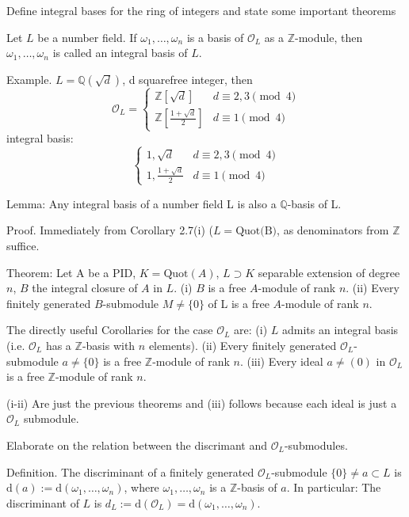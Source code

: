 Define integral bases for the ring of integers and state some
important theorems


Let \(L\) be a number field. If 
\(\omega_1, \ldots, \omega_n\) is a basis of \(\mathcal{O}_L\) as a \(\mathbb{Z}\)-module, then \(\omega_1, \ldots, \omega_n\) 
is called an integral basis of \(L\).

Example. 
\(L = \mathbb{Q}(\sqrt{d})\), d squarefree integer, then
\[
\mathcal{O}_L = 
\begin{cases} 
\mathbb{Z}[\sqrt{d}] & d \equiv 2, 3 \pmod{4} \\
\mathbb{Z}\left[\frac{1+\sqrt{d}}{2}\right] & d \equiv 1 \pmod{4} 
\end{cases}
\]
integral basis:
\[
\begin{cases} 
1, \sqrt{d} & d \equiv 2, 3 \pmod{4} \\
1, \frac{1+\sqrt{d}}{2} & d \equiv 1 \pmod{4} 
\end{cases}
\]

Lemma: Any integral basis of a number field L is also a \(\mathbb{Q}\)-basis of L.

Proof. Immediately from Corollary 2.7(i) (\( L = \text{Quot(B)} \), as denominators from \(\mathbb{Z}\) suffice.

Theorem:
Let A be a PID, \(K = \text{Quot}(A)\), \(L \supset K\) separable extension of degree \(n\), 
\(B\) the integral closure of \(A\) in \(L\).
(i) \(B\) is a free \(A\)-module of rank \(n\).
(ii) Every finitely generated \(B\)-submodule \(M \neq \{0\}\) of L is a free \(A\)-module of rank \( n \).

The directly useful Corollaries for the case \( \mathcal{O}_L \) are: 
(i) \(L\) admits an integral basis (i.e. \(\mathcal{O}_L\) has a \(\mathbb{Z}\)-basis with \(n\) elements).
(ii) Every finitely generated \(\mathcal{O}_L\)-submodule \(a \neq \{0\}\) is a free \(\mathbb{Z}\)-module of rank \(n\).
(iii) Every ideal \(a \neq (0)\) in \(\mathcal{O}_L\) is a free \(\mathbb{Z}\)-module of rank \(n\).

(i-ii) Are just the previous theorems and (iii) follows because each ideal is just a \( \mathcal{O}_L \) submodule.


Elaborate on the relation between the discrimant and \( \mathcal{O}_L \)-submodules.


Definition.
The discriminant of a finitely generated \(\mathcal{O}_L\)-submodule \(\{0\} \neq a \subset L\) is 
\(\text{d}(a) := \text{d}(\omega_1, \ldots, \omega_n)\), 
where \(\omega_1, \ldots, \omega_n\) is a \(\mathbb{Z}\)-basis of \(a\). 
In particular: The discriminant of \(L\) is \(d_L := \text{d}(\mathcal{O}_L) = \text{d}(\omega_1, \ldots, \omega_n)\).

